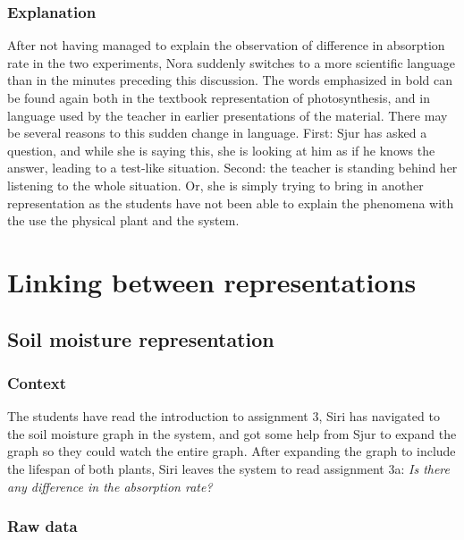 \subsubsection*{Explanation}
After not having managed to explain the observation of difference in absorption rate in the two experiments, Nora suddenly switches to a more scientific language than in the minutes preceding this discussion. The words emphasized in bold can be found again both in the textbook representation of photosynthesis, and in language used by the teacher in earlier presentations of the material. There may be several reasons to this sudden change in language. First: Sjur has asked a question, and while she is saying this, she is looking at him as if he knows the answer, leading to a test-like situation. Second: the teacher is standing behind her listening to the whole situation. Or, she is simply trying to bring in another representation as the students have not been able to explain the phenomena with the use the physical plant and the system. 


\section{Linking between representations}
\subsection{Soil moisture representation}


\subsubsection*{Context}
The students have read the introduction to assignment 3, Siri has navigated to the soil moisture graph in the system, and got some help from Sjur to expand the graph so they could watch the entire graph. After expanding the graph to include the lifespan of both plants, Siri leaves the system to read assignment 3a: \emph{Is there any difference in the absorption rate?}



\subsubsection*{Raw data}

